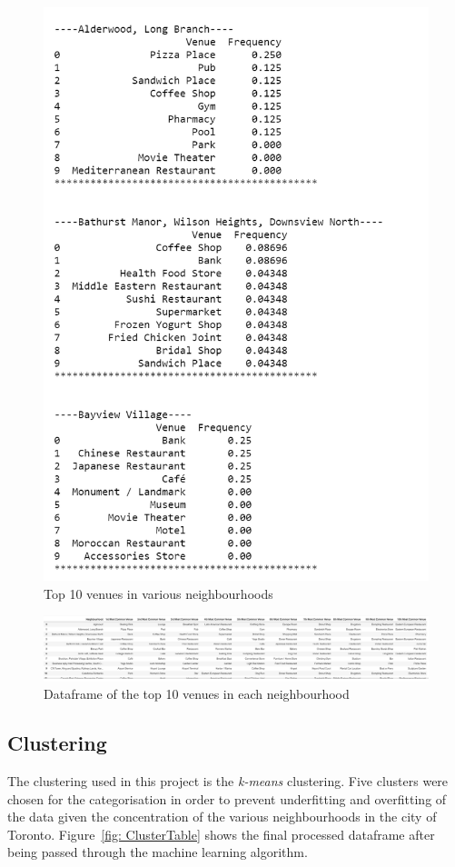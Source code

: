 \documentclass[12pt, conference]{IEEEtran}
\begin{document}
\begin{figure}[!h]
\center
\includegraphics[scale=0.65]{Top10Ex}
\caption{Top 10 venues in various neighbourhoods}
\label{fig: Top10Ex}
\end{figure}

\begin{figure}[!h]
\center
\includegraphics[scale=0.4]{Top10df}
\caption{Dataframe of the top 10 venues in each neighbourhood}
\label{fig: Top10df}
\end{figure}

\subsection{Clustering}
The clustering used in this project is the \textit{k-means} clustering. Five clusters were chosen for the categorisation in order to prevent underfitting and overfitting of the data given the concentration of the various neighbourhoods in the city of Toronto. Figure~\ref{fig: ClusterTable} shows the final processed dataframe after being passed through the machine learning algorithm.
\end{document}
